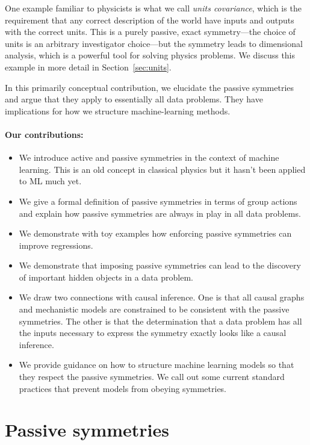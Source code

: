 \documentclass{article}
\theoremstyle{plain}
\theoremstyle{definition}
\theoremstyle{remark}
\newcommand{\sectionname}{Section}
\newcommand{\secref}[1]{\sectionname~\ref{#1}}
\begin{document}
One example familiar to physicists is what we call \emph{units covariance}, which is the requirement that any correct description of the world have inputs and outputs with the correct units.
This is a purely passive, exact symmetry---the choice of units is an arbitrary investigator choice---but the symmetry leads to dimensional analysis, which is a powerful tool for solving physics problems.
We discuss this example in more detail in \secref{sec:units}.

In this primarily conceptual contribution, we elucidate the passive symmetries and argue that they apply to essentially all data problems.
They have implications for how we structure machine-learning methods.

\paragraph{Our contributions:}
\begin{itemize}
\item
We introduce active and passive symmetries in the context of machine learning. This is an old concept in classical physics but it hasn't been applied to ML much yet.
\item
We give a formal definition of passive symmetries in terms of group actions and explain how passive symmetries are always in play in all data problems.
\item
We demonstrate with toy examples how enforcing passive symmetries can improve regressions. 
\item
We demonstrate that imposing passive symmetries can lead to the discovery of important hidden objects in a data problem.
\item
We draw two connections with causal inference. One is that all causal graphs and mechanistic models are constrained to be consistent with the passive symmetries. The other is that the determination that a data problem has all the inputs necessary to express the symmetry exactly looks like a causal inference.
\item 
We provide guidance on how to structure machine learning models so that they respect the passive symmetries. We call out some current standard practices that prevent models from obeying symmetries. 
\end{itemize}

\section{Passive symmetries}\label{sec:informal}
\end{document}
